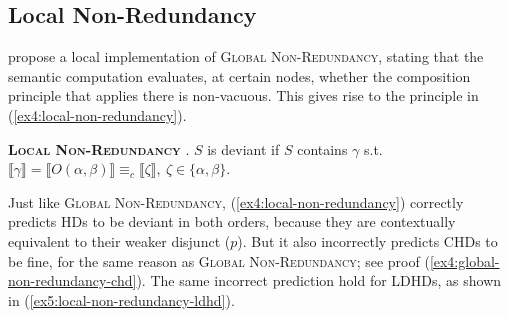 \begin{exe}
	\label{ex4:global-non-redundancy-chd}
	\label{ex4:global-non-redundancy-ldhd}
\end{exe}


\subsection{Local Non-Redundancy}
\citet{Katzir2014} propose a local implementation of \textsc{Global Non-Redundancy}, stating that the semantic computation evaluates, at
certain nodes, whether the composition principle that applies there is non-vacuous. This gives rise to the principle in (\ref{ex4:local-non-redundancy}).

\begin{exe}
	 {\textsc{\textbf{Local Non-Redundancy}} \citep{Katzir2014}. $S$ is deviant if $S$ contains $\gamma$ s.t. $\llbracket \gamma \rrbracket = \llbracket O(\alpha, \beta) \rrbracket \equiv_c \llbracket\zeta \rrbracket, \ \zeta \in \lbrace \alpha, \beta\rbrace$.}
\end{exe}

Just like \textsc{Global Non-Redundancy}, (\ref{ex4:local-non-redundancy}) correctly predicts HDs to be deviant in both orders, because they are contextually equivalent to their weaker disjunct ($p$). But it also incorrectly predicts CHDs to be fine, for the same reason as \textsc{Global Non-Redundancy}; see proof (\ref{ex4:global-non-redundancy-chd}). The same incorrect prediction hold for LDHDs, as shown in (\ref{ex5:local-non-redundancy-ldhd}).

